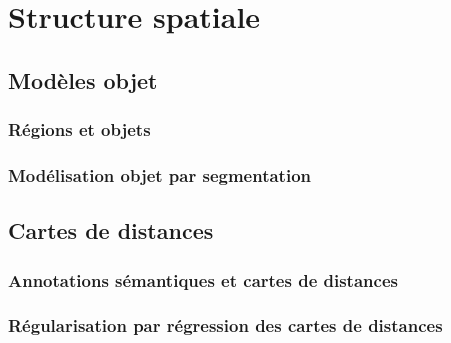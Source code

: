 \chapter{Structure spatiale}

\section{Modèles objet}

\subsection{Régions et objets}

\subsection{Modélisation objet par segmentation}

\section{Cartes de distances}

\subsection{Annotations sémantiques et cartes de distances}

\subsection{Régularisation par régression des cartes de distances}
